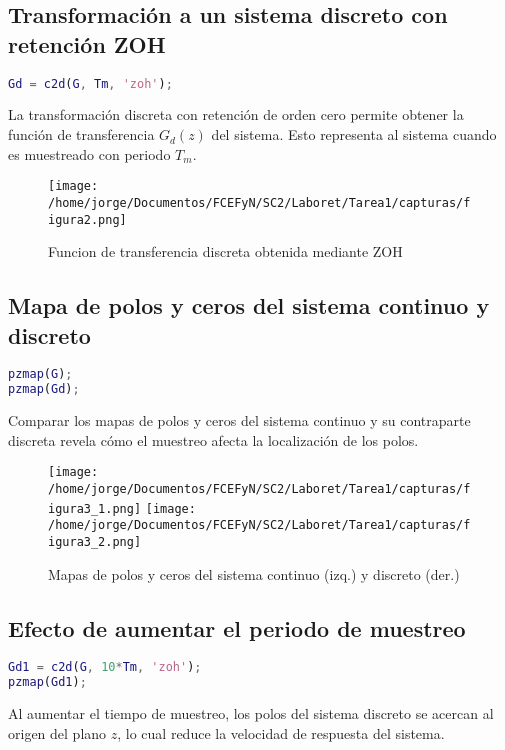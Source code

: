 \documentclass[11pt]{article}
\begin{document}
\subsection{Transformación a un sistema discreto con retención ZOH}
\begin{lstlisting}[language=Matlab]
Gd = c2d(G, Tm, 'zoh');
\end{lstlisting}

La transformación discreta con retención de orden cero permite obtener la función de transferencia \(G_d(z)\) del sistema. Esto representa al sistema cuando es muestreado con periodo \(T_m\).

\begin{figure}[h!]
    \centering
    \texttt{[image: /home/jorge/Documentos/FCEFyN/SC2/Laboret/Tarea1/capturas/figura2.png]}
    \caption{Funcion de transferencia discreta obtenida mediante ZOH}
\end{figure}

\subsection{Mapa de polos y ceros del sistema continuo y discreto}
\begin{lstlisting}[language=Matlab]
pzmap(G);
pzmap(Gd);
\end{lstlisting}

Comparar los mapas de polos y ceros del sistema continuo y su contraparte discreta revela cómo el muestreo afecta la localización de los polos.

\begin{figure}[h!]
    \centering
    \texttt{[image: /home/jorge/Documentos/FCEFyN/SC2/Laboret/Tarea1/capturas/figura3\_1.png]}
    \texttt{[image: /home/jorge/Documentos/FCEFyN/SC2/Laboret/Tarea1/capturas/figura3\_2.png]}
    \caption{Mapas de polos y ceros del sistema continuo (izq.) y discreto (der.)}
\end{figure}

\newpage

\subsection{Efecto de aumentar el periodo de muestreo}
\begin{lstlisting}[language=Matlab]
Gd1 = c2d(G, 10*Tm, 'zoh');
pzmap(Gd1);
\end{lstlisting}

Al aumentar el tiempo de muestreo, los polos del sistema discreto se acercan al origen del plano \(z\), lo cual reduce la velocidad de respuesta del sistema.
\end{document}

